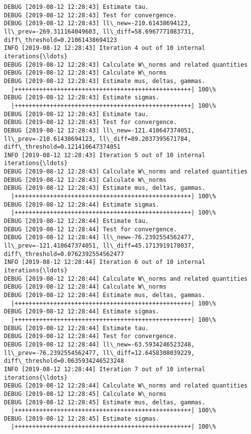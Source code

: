 \documentclass[11pt]{article}
\begin{document}
\begin{Verbatim}[commandchars=\\\{\}]
DEBUG [2019-08-12 12:28:43] Estimate tau.
DEBUG [2019-08-12 12:28:43] Test for convergence.
DEBUG [2019-08-12 12:28:43] ll\_new=-210.61438694123, ll\_prev=-269.311164049603, ll\_diff=58.6967771083731, diff\_threshold=0.21061438694123
INFO [2019-08-12 12:28:43] Iteration 4 out of 10 internal iterations{\ldots}
DEBUG [2019-08-12 12:28:43] Calculate W\_norms and related quantities
DEBUG [2019-08-12 12:28:43] Calculate W\_norms
DEBUG [2019-08-12 12:28:43] Estimate mus, deltas, gammas.
  |++++++++++++++++++++++++++++++++++++++++++++++++++| 100\%
DEBUG [2019-08-12 12:28:43] Estimate sigmas.
  |++++++++++++++++++++++++++++++++++++++++++++++++++| 100\%
DEBUG [2019-08-12 12:28:43] Estimate tau.
DEBUG [2019-08-12 12:28:43] Test for convergence.
DEBUG [2019-08-12 12:28:43] ll\_new=-121.410647374051, ll\_prev=-210.61438694123, ll\_diff=89.2037395671784, diff\_threshold=0.121410647374051
INFO [2019-08-12 12:28:43] Iteration 5 out of 10 internal iterations{\ldots}
DEBUG [2019-08-12 12:28:43] Calculate W\_norms and related quantities
DEBUG [2019-08-12 12:28:43] Calculate W\_norms
DEBUG [2019-08-12 12:28:43] Estimate mus, deltas, gammas.
  |++++++++++++++++++++++++++++++++++++++++++++++++++| 100\%
DEBUG [2019-08-12 12:28:44] Estimate sigmas.
  |++++++++++++++++++++++++++++++++++++++++++++++++++| 100\%
DEBUG [2019-08-12 12:28:44] Estimate tau.
DEBUG [2019-08-12 12:28:44] Test for convergence.
DEBUG [2019-08-12 12:28:44] ll\_new=-76.2392554562477, ll\_prev=-121.410647374051, ll\_diff=45.1713919178037, diff\_threshold=0.0762392554562477
INFO [2019-08-12 12:28:44] Iteration 6 out of 10 internal iterations{\ldots}
DEBUG [2019-08-12 12:28:44] Calculate W\_norms and related quantities
DEBUG [2019-08-12 12:28:44] Calculate W\_norms
DEBUG [2019-08-12 12:28:44] Estimate mus, deltas, gammas.
  |++++++++++++++++++++++++++++++++++++++++++++++++++| 100\%
DEBUG [2019-08-12 12:28:44] Estimate sigmas.
  |++++++++++++++++++++++++++++++++++++++++++++++++++| 100\%
DEBUG [2019-08-12 12:28:44] Estimate tau.
DEBUG [2019-08-12 12:28:44] Test for convergence.
DEBUG [2019-08-12 12:28:44] ll\_new=-63.5934246523248, ll\_prev=-76.2392554562477, ll\_diff=12.6458308039229, diff\_threshold=0.0635934246523248
INFO [2019-08-12 12:28:44] Iteration 7 out of 10 internal iterations{\ldots}
DEBUG [2019-08-12 12:28:44] Calculate W\_norms and related quantities
DEBUG [2019-08-12 12:28:45] Calculate W\_norms
DEBUG [2019-08-12 12:28:45] Estimate mus, deltas, gammas.
  |++++++++++++++++++++++++++++++++++++++++++++++++++| 100\%
DEBUG [2019-08-12 12:28:45] Estimate sigmas.
  |++++++++++++++++++++++++++++++++++++++++++++++++++| 100\%

\end{Verbatim}
\end{document}
